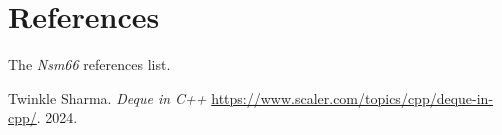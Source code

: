 %
%
%

\section{References}
\label{sec:references}

   The \textsl{Nsm66} references list.

{\RaggedRight
\begin{thebibliography}{99}

   Twinkle Sharma.
   \emph{Deque in C++}
   \url{https://www.scaler.com/topics/cpp/deque-in-cpp/}.
   2024.

\end{thebibliography}
}


